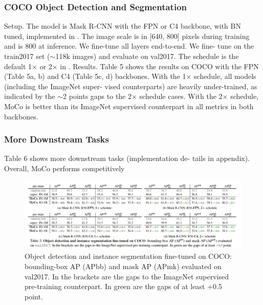 \documentclass[10pt,twocolumn]{article}  %
\begin{document}
\subsubsection{COCO Object Detection and Segmentation}
Setup. The model is Mask R-CNN \cite{32_he2017mask} with the FPN \cite{41_lin2017feature}
or C4 backbone, with BN tuned, implemented in \cite{60_wu2019detectron2}. The
image scale is in [640, 800] pixels during training and is 800
at inference. We ﬁne-tune all layers end-to-end. We ﬁne-
tune on the train2017 set ($\sim $118k images) and evaluate
on val2017. The schedule is the default 1$\times $ or 2$\times $ in \cite{22_girshick2018detectron}.
Results. Table 5 shows the results on COCO with the FPN
(Table 5a, b) and C4 (Table 5c, d) backbones. With the
1$\times $ schedule, all models (including the ImageNet super-
vised counterparts) are heavily under-trained, as indicated
by the $\sim $2 points gaps to the 2$\times $ schedule cases. With the
2$\times $ schedule, MoCo is better than its ImageNet supervised
counterpart in all metrics in both backbones.

\subsubsection{More Downstream Tasks}
Table 6 shows more downstream tasks (implementation de-
tails in appendix). Overall, MoCo performs competitively


\begin{figure}[htbp]
    \centering
    \includegraphics[width=0.8\linewidth]{Pic/table5.png} %
    \caption{Object detection and instance segmentation ﬁne-tuned on COCO: bounding-box AP (APbb) and mask AP (APmk) evaluated
    on val2017. In the brackets are the gaps to the ImageNet supervised pre-training counterpart. In green are the gaps of at least +0.5 point.} %
    \label{fig:Table 5} %
\end{figure}
\end{document}
